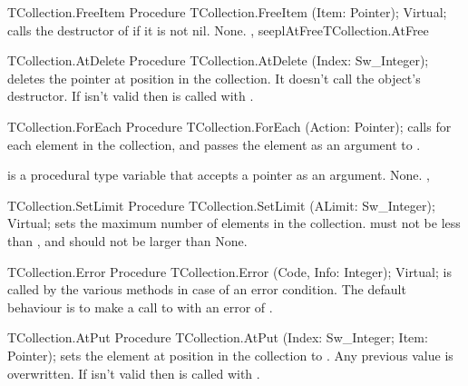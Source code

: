\begin{procedure}{TCollection.FreeItem}
\Declaration
Procedure TCollection.FreeItem (Item: Pointer); Virtual;
\Description
{} calls the destructor of  if it is not nil.
\Errors
None.
\SeeAlso
{}, seepl{AtFree}{TCollection.AtFree}
\end{procedure}


\begin{procedure}{TCollection.AtDelete}
\Declaration
Procedure TCollection.AtDelete (Index: Sw\_Integer);
\Description
{} deletes the pointer at position  in the
collection. It doesn't call the object's destructor.
\Errors
If  isn't valid then  is called
with .
\SeeAlso
{}
\end{procedure}


\begin{procedure}{TCollection.ForEach}
\Declaration
Procedure TCollection.ForEach (Action: Pointer);
\Description
{} calls  for each element in the collection,
and passes the element as an argument to .

 is a procedural type variable that accepts a pointer as an 
argument.
\Errors
None.
\SeeAlso
{}, 
\end{procedure}


\begin{procedure}{TCollection.SetLimit}
\Declaration
Procedure TCollection.SetLimit (ALimit: Sw\_Integer); Virtual;
\Description
{} sets the maximum number of elements in the collection.
 must not be less than , and should not be larger
than 
\Errors
None.
\SeeAlso
{}
\end{procedure}


\begin{procedure}{TCollection.Error}
\Declaration
Procedure TCollection.Error (Code, Info: Integer); Virtual;
\Description
{} is called by the various  methods
in case of an error condition. The default behaviour is to make
a call to  with an error of .
\Errors
\SeeAlso
\end{procedure}


\begin{procedure}{TCollection.AtPut}
\Declaration
Procedure TCollection.AtPut (Index: Sw\_Integer; Item: Pointer);
\Description
{} sets the element at position  in the collection
to . Any previous value is overwritten.
\Errors
If  isn't valid then  is called
with .
\SeeAlso
\end{procedure}


